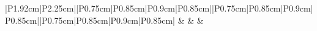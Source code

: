\documentclass{subfiles}
\begin{document}
\begin{table}
	\renewcommand{\arraystretch}{1.3}

	\centering
	\begin{tabular}{|P{1.92cm}|P{2.25cm}||P{0.75cm}|P{0.85cm}|P{0.9cm}|P{0.85cm}||P{0.75cm}|P{0.85cm}|P{0.9cm}|P{0.85cm}||P{0.75cm}|P{0.85cm}|P{0.9cm}|P{0.85cm}|}	
		\hlinewd{1.5pt}
		 &  &  &  \\
		\hline
		

\end{tabular}
\end{table}
\end{document}
